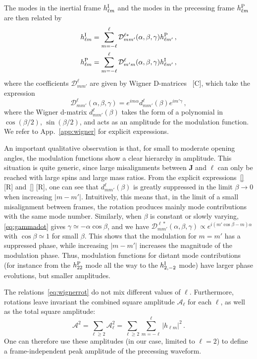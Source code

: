 \documentclass[aps,showpacs,twocolumn,
prd,superscriptaddress,nofootinbib]{revtex4-1}
\newcommand{\be}{\begin{equation}}
\newcommand{\ee}{\end{equation}}
\newcommand\calD{{\mathcal{D}}}
\newcommand\calA{{\mathcal{A}}}
\newcommand{\SM}[1]{{\color{Red} #1}}
\begin{document}
The modes in the inertial frame $h_{\ell m}^{\rm I}$ and the modes in the precessing frame $h_{\ell m}^{\rm P}$ are then related by~\cite{Goldberg+67}
\begin{subequations}
\label{eq:wignerrot}
\begin{align}
	h_{\ell m}^{\rm I} = \sum\limits_{m=-\ell}^{\ell} \calD^{\ell *}_{mm'} (\alpha,\beta,\gamma) h_{\ell m'}^{\rm P} \,, \\
	h_{\ell m}^{\rm P} = \sum\limits_{m=-\ell}^{\ell} \calD^{\ell }_{m'm} (\alpha,\beta,\gamma) h_{\ell m'}^{\rm I} \,,
\end{align}
\end{subequations}
where the coefficients $\calD^{\ell}_{mm'}$ are given by Wigner D-matrices~\cite{} \SM{[C]}, which take the expression
\be\label{eq:defWignerD}
	\calD^{\ell}_{mm'} (\alpha, \beta, \gamma) = e^{im \alpha} d^{\ell}_{mm'}(\beta) e^{im' \gamma}\,,
\ee
where the Wigner d-matrix $d^{\ell}_{mm'}(\beta)$ takes the form of a polynomial in $\cos (\beta/2)$, $\sin (\beta/2)$, and acts as an amplitude for the modulation function. We refer to App.~\ref{app:wigner} for explicit expressions.

An important qualitative observation is that, for small to moderate opening angles, the modulation functions show a clear hierarchy in amplitude. This situation is quite generic, since large misalignments between $\bm{J}$ and $\bm{\ell}$ can only be reached with large spins and large mass ratios. From the explicit expressions~\eqref{} \SM{[R]} and~\eqref{} \SM{[R]}, one can see that $d^{\ell}_{mm'}(\beta)$ is greatly suppressed in the limit $\beta \rightarrow 0$ when increasing $|m-m'|$. Intuitively, this means that, in the limit of a small misalignment between frames, the rotation produces mainly mode contributions with the same mode number. Similarly, when $\beta$ is constant or slowly varying, \eqref{eq:gammadot} gives $\gamma \simeq - \alpha \cos\beta$, and we have $\calD^{\ell *}_{mm'} (\alpha, \beta, \gamma) \propto e^{i(m' \cos\beta - m) \alpha}$ with $\cos\beta \simeq 1$ for small $\beta$. This shows that the modulation for $m=m'$ has a suppressed phase, while increasing $|m-m'|$ increases the magnitude of the modulation phase. Thus, modulation functions for distant mode contributions (for instance from the $h^{\rm P}_{22}$ mode all the way to the $h^{\rm I}_{2,-2}$ mode) have larger phase evolutions, but smaller amplitudes.

The relations~\eqref{eq:wignerrot} do not mix different values of $\ell$. Furthermore, rotations leave invariant the combined square amplitude $\calA_{\ell}$ for each $\ell$, as well as the total square amplitude:
\be
	\calA^{2} = \sum\limits_{\ell \geq 2}\calA_{\ell}^{2} = \sum\limits_{\ell \geq 2}\sum\limits_{m=-\ell}^{\ell} |h_{\ell m}|^{2} \,.
\ee
One can therefore use these amplitudes (in our case, limited to $\ell = 2$) to define a frame-independent peak amplitude of the precessing waveform.
\end{document}
